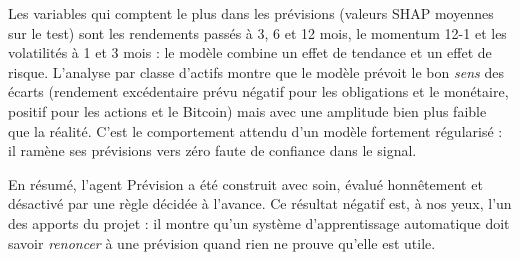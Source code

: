 Les variables qui comptent le plus dans les prévisions (valeurs SHAP moyennes sur le test) sont les rendements passés à 3, 6 et 12 mois, le momentum 12-1 et les volatilités à 1 et 3 mois : le modèle combine un effet de tendance et un effet de risque. L'analyse par classe d'actifs montre que le modèle prévoit le bon \emph{sens} des écarts (rendement excédentaire prévu négatif pour les obligations et le monétaire, positif pour les actions et le Bitcoin) mais avec une amplitude bien plus faible que la réalité. C'est le comportement attendu d'un modèle fortement régularisé : il ramène ses prévisions vers zéro faute de confiance dans le signal.

En résumé, l'agent Prévision a été construit avec soin, évalué honnêtement et désactivé par une règle décidée à l'avance. Ce résultat négatif est, à nos yeux, l'un des apports du projet : il montre qu'un système d'apprentissage automatique doit savoir \emph{renoncer} à une prévision quand rien ne prouve qu'elle est utile.
